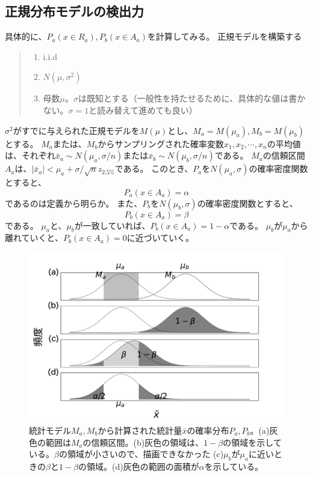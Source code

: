 \subsection{正規分布モデルの検出力}
具体的に、$P_a(x \in R_a),P_b(x \in A_a)$を計算してみる。
正規モデルを構築する
\begin{quote}
    \begin{enumerate}[(1)]
\item i.i.d
\item $N(\mu,\sigma^2)$
\item 母数$\mu$。$\sigma$は既知とする（一般性を持たせるために、具体的な値は書かない。$\sigma=1$と読み替えて進めても良い）
\end{enumerate}
\end{quote}
\fi
$\sigma^2$がすでに与えられた正規モデルを$M(\mu)$とし、$M_a=M(\mu_a),M_b=M(\mu_b)$とする。
$M_a$または、$M_b$からサンプリングされた確率変数$x_1,x_2,\cdots,x_n$の平均値は、それぞれ$\bar{x}_a\sim N(\mu_a,\sigma/n)$または$\bar{x}_b\sim N(\mu_b,\sigma/n)$である。
$M_a$の信頼区間$A_a$は、$|\bar{x}_a|<\mu_a+\sigma / \sqrt{n}z_{2.5\%}$である。
このとき、$P_a$を$N(\mu_a,\sigma)$の確率密度関数とすると、
\begin{equation*}
    P_a(x \in A_a) = \alpha
\end{equation*}
であるのは定義から明らか。
また、$P_b$を$N(\mu_b,\sigma)$の確率密度関数とすると、
\begin{equation*}
    P_b(x \in A_a ) = \beta
\end{equation*}
である。
$\mu_a$と、$\mu_b$が一致していれば、$P_b(x \in A_a ) = 1-\alpha$である。
$\mu_b$が$\mu_a$から離れていくと、$P_b(x \in A_a)=0$に近づいていく。


\begin{figure}
\begin{center}
    \includegraphics[width=15cm]{./image/04_/power_of_a_test_2.pdf}
    \caption{統計モデル$M_a,M_b$から計算された統計量$\bar{x}$の確率分布$P_a,P_b$。(a)灰色の範囲は$M_a$の信頼区間。(b)灰色の領域は、$1-\beta$の領域を示している。$\beta$の領域が小さいので、描画できなかった (c)$\mu_b$が$\mu_a$に近いときの$\beta$と$1-\beta$の領域。(d)灰色の範囲の面積が$\alpha$を示している。}
    \label{fig:power_of_test_alpha_beta}
\end{center}
\end{figure}


